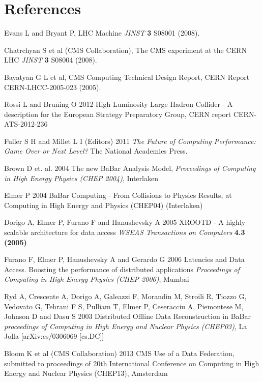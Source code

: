 \documentclass[a4paper]{jpconf}
\begin{document}
\section*{References}
\begin{thebibliography}{9}
 Evans L and Bryant P,  LHC Machine {\it JINST}
  {\bf 3} S08001 (2008).

 Chatrchyan S et al (CMS Collaboration),  The CMS
  experiment at the CERN LHC {\it JINST} {\bf 3} S08004 (2008).

 Bayatyan G L et al,  CMS Computing Technical Design
  Report, CERN Report CERN-LHCC-2005-023 (2005).

 Rossi L and Bruning O 2012 High Luminosity Large Hadron
  Collider - A description for the European Strategy Preparatory
  Group, CERN report CERN-ATS-2012-236

 Fuller S H and Millet L I (Editors) 2011 {\it The
  Future of Computing Performance:  Game Over or Next Level?}
  The National Academies Press.

 Brown D et. al. 2004 The new BaBar Analysis
  Model, {\it Proceedings of Computing in High Energy Physics (CHEP
    2004)}, Interlaken 

 Elmer P 2004 BaBar Computing - From Collisions to
  Physics Results, at Computing in High Energy and Physics (CHEP04)
  (Interlaken)

 Dorigo A, Elmer P, Furano F and Hanushevsky A 2005
  XROOTD - A highly scalable architecture for data access {\it WSEAS
    Transactions on Computers} {\bf 4.3 (2005)}

 Furano F, Elmer P, Hanushevsky A and Gerardo G 2006
  Latencies and Data Access. Boosting the performance of distributed
  applications {\it Proceedings of Computing in High Energy Physics
    (CHEP 2006)}, Mumbai

 Ryd A, Crescente A, Dorigo A, Galeazzi F, Morandin
  M, Stroili R, Tiozzo G, Vedovato G, Tehrani F S, Pulliam T, Elmer P,
  Ceseracciu A, Piemontese M, Johnson D and Dasu S 2003 Distributed
  Offline Data Reconstruction in BaBar {\it proceedings of Computing
    in High Energy and Nuclear Physics (CHEP03)}, La Jolla
  [arXiv:cs/0306069 [cs.DC]]

 Bloom K et al (CMS Collaboration) 2013 CMS Use of
  a Data Federation, submitted to proceedings of 20th International
  Conference on Computing in High Energy and Nuclear Physics (CHEP13),
  Amsterdam


\end{thebibliography}
\end{document}
